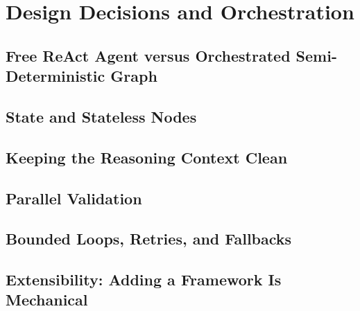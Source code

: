 \chapter{Design Decisions and Orchestration}
\label{chap:design}

\section{Free ReAct Agent versus Orchestrated Semi-Deterministic Graph}
\label{sec:design-agent-vs-graph}


\section{State and Stateless Nodes}
\label{sec:design-state}


\section{Keeping the Reasoning Context Clean}
\label{sec:design-isolation}


\section{Parallel Validation}
\label{sec:design-parallel}


\section{Bounded Loops, Retries, and Fallbacks}
\label{sec:design-bounds}


\section{Extensibility: Adding a Framework Is Mechanical}
\label{sec:design-extensibility}

